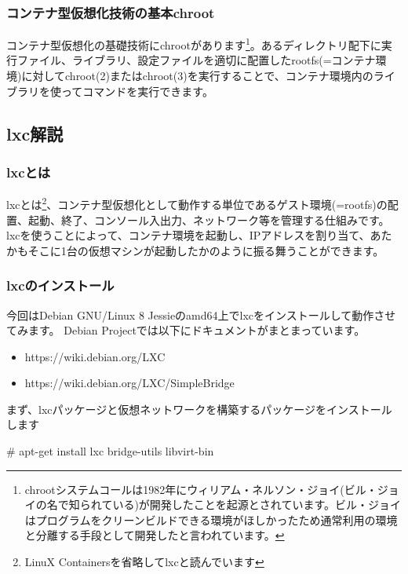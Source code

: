\documentclass[mingoth,a4paper]{jsarticle}
\begin{document}
\subsubsection{コンテナ型仮想化技術の基本chroot}

コンテナ型仮想化の基礎技術にchrootがあります\footnote{chrootシステムコールは1982年にウィリアム・ネルソン・ジョイ(ビル・ジョイの名で知られている)が開発したことを起源とされています。ビル・ジョイはプログラムをクリーンビルドできる環境がほしかったため通常利用の環境と分離する手段として開発したと言われています。}。あるディレクトリ配下に実行ファイル、ライブラリ、設定ファイルを適切に配置したrootfs(=コンテナ環境)に対してchroot(2)またはchroot(3)を実行することで、コンテナ環境内のライブラリを使ってコマンドを実行できます。

\subsection{lxc解説}
\subsubsection{lxcとは}

lxcとは\footnote{LinuX Containersを省略してlxcと読んでいます}、コンテナ型仮想化として動作する単位であるゲスト環境(=rootfs)の配置、起動、終了、コンソール入出力、ネットワーク等を管理する仕組みです。
lxcを使うことによって、コンテナ環境を起動し、IPアドレスを割り当て、あたかもそこに1台の仮想マシンが起動したかのように振る舞うことができます。

\subsubsection{lxcのインストール}

今回はDebian GNU/Linux 8 Jessieのamd64上でlxcをインストールして動作させてみます。
Debian Projectでは以下にドキュメントがまとまっています。

\begin{itemize}
\item https://wiki.debian.org/LXC
\item https://wiki.debian.org/LXC/SimpleBridge
\end{itemize}

まず、lxcパッケージと仮想ネットワークを構築するパッケージをインストールします

\begin{commandline}
# apt-get install lxc bridge-utils libvirt-bin
\end{commandline}
\end{document}
